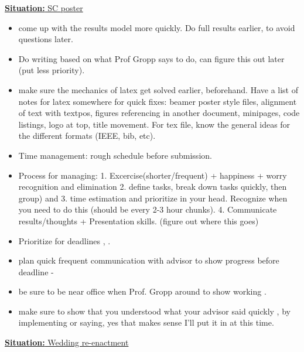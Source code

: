 \documentclass[11pt]{article}
\newcommand{\newSituation}[1]{\underline{\textbf{Situation:} #1} }
\begin{document}
\newSituation{SC poster} 
\begin{itemize}
\item  come up with the results model more quickly.  Do full results earlier, to avoid questions later.
\item Do writing based on what Prof Gropp says to do, can figure this out later (put less priority).
\item  make sure the mechanics of latex get solved earlier,
beforehand. Have a list of notes for latex somewhere for quick fixes:
beamer poster style files, alignment of text with textpos, figures
referencing in another document,  minipages, code listings, logo at
top, title movement. For tex file, know the general ideas for the
different formats (IEEE, bib, etc).
\item Time management: rough schedule before submission.

\item Process for managing:  1. Excercise(shorter/frequent) + happiness + worry recognition
and elimination   2. define tasks, break down tasks quickly, then
group) and 3. time estimation and prioritize in your head. Recognize
when you need to do this (should be every 2-3 hour
chunks). 4. Communicate results/thoughts + Presentation
skills. (figure out where this goes)

\item Prioritize for deadlines ,      .
\item  plan quick frequent communication with advisor to show progress
before deadline  -
\item  be sure to be near office when Prof. Gropp around to show working .

\item  make sure to show that you understood what your advisor said
quickly , by implementing or saying, yes that makes sense I'll put it
in at this time.

\end{itemize}


\newSituation{Wedding re-enactment} 
\end{document}
